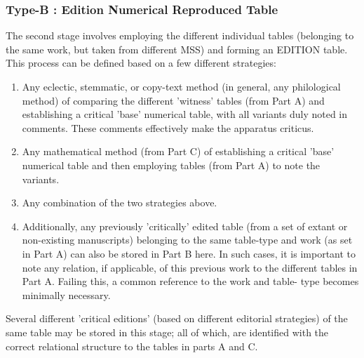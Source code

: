 \documentclass[a4paper,12pt,twoside]{book}
\begin{document}
				\subsubsection{Type-B : Edition Numerical Reproduced Table}
	The second stage involves employing the different individual tables (belonging to the same work, but taken from different MSS) and forming an EDITION table. This process can be defined based on a few different strategies:
	\begin{enumerate}
		\item Any eclectic, stemmatic, or copy-text method (in general, any philological method) of comparing the different 'witness' tables (from Part A) and establishing a critical 'base' numerical table, with all variants duly noted in comments. These comments effectively make the apparatus criticus.
		\item Any mathematical method (from Part C) of establishing a critical 'base' numerical table and then employing tables (from Part A) to note the variants.
		\item Any combination of the two strategies above.
		\item Additionally, any previously 'critically' edited table (from a set of extant or non-existing manuscripts) belonging to the same table-type and work (as set in Part A) can also be stored in Part B here. In such cases, it is important to note any relation, if applicable, of this previous work to the different tables in Part A. Failing this, a common reference to the work and table- type becomes minimally necessary.
	\end{enumerate}
	Several different 'critical editions' (based on different editorial strategies) of the same table may be stored in this stage; all of which, are identified with the correct relational structure to the tables in parts A and C.
	
\end{document}
